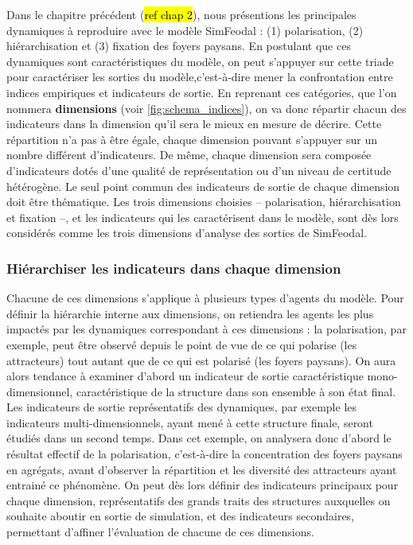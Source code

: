 Dans le chapitre précédent (\hl{ref chap 2}), nous présentions les principales dynamiques à reproduire avec le modèle SimFeodal : (1) polarisation, (2) hiérarchisation et (3) fixation des foyers paysans. En postulant que ces dynamiques sont caractéristiques du modèle, on peut s'appuyer sur cette triade pour caractériser les sorties du modèle,c'est-à-dire mener la confrontation entre indices empiriques et indicateurs de sortie. En reprenant ces catégories, que l'on nommera \textbf{dimensions} (voir \cref{fig:schema_indices}), on va donc répartir chacun des indicateurs dans la dimension qu'il sera le mieux en mesure de décrire. Cette répartition n'a pas à être égale, chaque dimension pouvant s'appuyer sur un nombre différent d'indicateurs. De même, chaque dimension sera composée d'indicateurs dotés d'une qualité de représentation ou d'un niveau de certitude hétérogène. Le seul point commun des indicateurs de sortie de chaque dimension doit être thématique.
Les trois dimensions choisies -- polarisation, hiérarchisation et fixation --, et les indicateurs qui les caractérisent dans le modèle, sont dès lors considérés comme les trois dimensions d'analyse des sorties de SimFeodal.

\subsubsection{Hiérarchiser les indicateurs dans chaque dimension}\label{par:hierarchie_interne}
Chacune de ces dimensions s'applique à plusieurs types d'agents du modèle. Pour définir la hiérarchie interne aux dimensions, on retiendra les agents les plus impactés par les dynamiques correspondant à ces dimensions : la polarisation, par exemple, peut être observé depuis le point de vue de ce qui polarise (les attracteurs) tout autant que de ce qui est polarisé (les foyers paysans).
On aura alors tendance à examiner d'abord un indicateur de sortie caractéristique mono-dimensionnel, caractéristique de la structure dans son ensemble à son état final. Les indicateurs de sortie représentatifs des dynamiques, par exemple les indicateurs multi-dimensionnels, ayant mené à cette structure finale, seront étudiés dans un second temps.
Dans cet exemple, on analysera donc d'abord le résultat effectif de la polarisation, c'est-à-dire la concentration des foyers paysans en agrégats, avant d'observer la répartition et les diversité des attracteurs ayant entrainé ce phénomène. On peut dès lors définir des \og indicateurs principaux\fg{} pour chaque dimension, représentatifs des grands traits des structures auxquelles on souhaite aboutir en sortie de simulation, et des \og indicateurs secondaires\fg{}, permettant d'affiner l'évaluation de chacune de ces dimensions.

